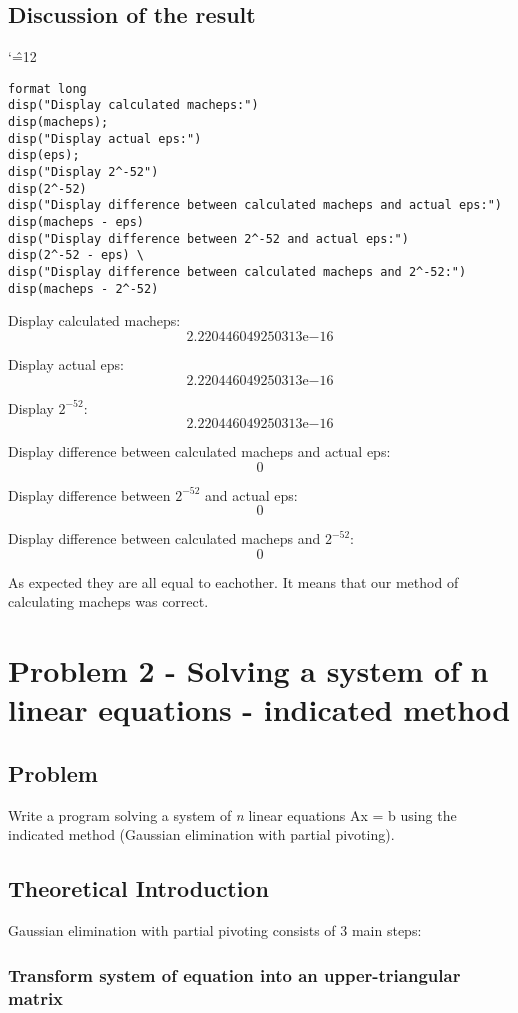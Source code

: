 \documentclass{report}
\newenvironment{simplechar}{%
   \catcode`\^=12
}{}
\begin{document}
\section{Discussion of the result}
\begin{simplechar}
\begin{lstlisting}
format long
disp("Display calculated macheps:")
disp(macheps);
disp("Display actual eps:")
disp(eps);
disp("Display 2^-52")
disp(2^-52)
disp("Display difference between calculated macheps and actual eps:")
disp(macheps - eps)
disp("Display difference between 2^-52 and actual eps:")
disp(2^-52 - eps) \
disp("Display difference between calculated macheps and 2^-52:")
disp(macheps - 2^-52)
\end{lstlisting}
\end{simplechar}
Display calculated macheps:
     \[2.220446049250313\mathrm{e}{-16}\]

Display actual eps:
     \[2.220446049250313\mathrm{e}{-16}\]

Display $2^{-52}$:
     \[2.220446049250313\mathrm{e}{-16}\]

Display difference between calculated macheps and actual eps:
     \[0\]

Display difference between $2^{-52}$ and actual eps:
          \[0\]

Display difference between calculated macheps and $2^{-52}$:
         \[0\]

As expected they are all equal to eachother. It means that our method of calculating macheps was correct.


\chapter{Problem 2 - Solving a system of n linear equations - indicated method}

\section{Problem}
Write a program solving a system of \textit{n} linear equations Ax = b using the indicated method (Gaussian elimination with partial pivoting).

\section{Theoretical Introduction}
Gaussian elimination with partial pivoting consists of 3 main steps:
\subsection{Transform system of equation into an upper-triangular matrix}
\end{document}
